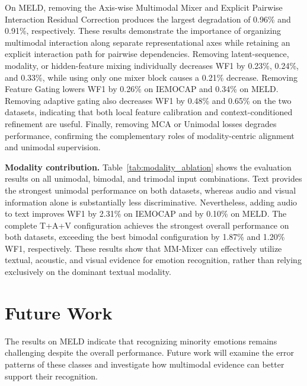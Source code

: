 \documentclass[letterpaper]{article} %
\begin{document}
On MELD, removing the Axis-wise Multimodal Mixer and Explicit Pairwise Interaction Residual Correction produces the largest degradation of 0.96\% and 0.91\%,
respectively. These results demonstrate the importance of organizing
multimodal interaction along separate representational axes while
retaining an explicit interaction path for pairwise dependencies. Removing
latent-sequence, modality, or hidden-feature mixing individually decreases WF1 by
0.23\%, 0.24\%, and 0.33\%, while using only one mixer block causes a
0.21\% decrease. Removing Feature Gating lowers WF1 by 0.26\%
on IEMOCAP and 0.34\% on MELD. Removing adaptive gating also decreases WF1
by 0.48\% and 0.65\% on the two datasets, indicating that both local
feature calibration and context-conditioned refinement are useful.
Finally, removing MCA or Unimodal losses degrades performance, confirming the complementary roles of modality-centric alignment and unimodal supervision.

\noindent\textbf{Modality contribution.}
Table~\ref{tab:modality_ablation} shows the evaluation results on all unimodal, bimodal, and trimodal input combinations. Text provides the strongest unimodal performance on both datasets, whereas audio and visual information alone is substantially less discriminative. Nevertheless, adding audio to text improves WF1 by 2.31\% on IEMOCAP and by 0.10\% on MELD. The complete T+A+V configuration achieves the strongest overall performance on both datasets, exceeding the best bimodal configuration by 1.87\% and 1.20\% WF1, respectively. These results show that MM-Mixer can effectively utilize textual, acoustic, and visual evidence for emotion recognition, rather than relying exclusively on the dominant textual modality.




\section{Future Work}

The results on MELD indicate that recognizing minority emotions remains
challenging despite the overall performance. Future work will examine
the error patterns of these classes and investigate how multimodal
evidence can better support their recognition.
\end{document}

